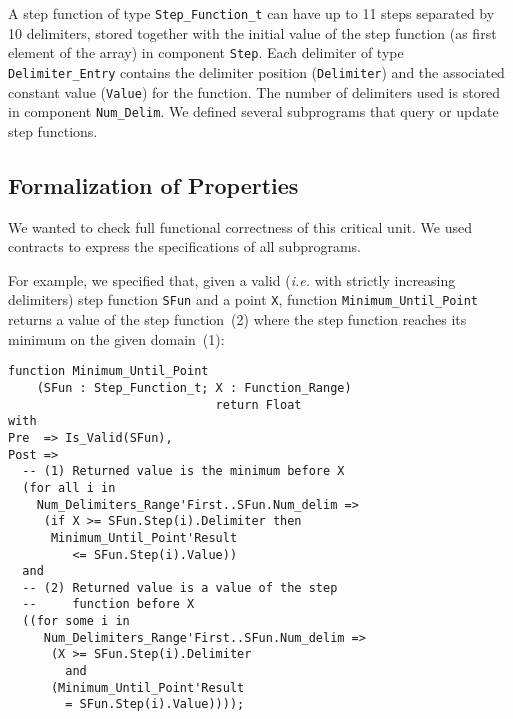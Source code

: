 \documentclass[10pt,a4paper,twocolumn]{article}
\newcommand{\ie}{\textit{i.e.}\xspace}
\begin{document}
A step function of type \verb|Step_Function_t| can have up to 11 steps
separated by 10 delimiters, stored together with the initial value of
the step function (as first element of the array) in component
\verb|Step|. Each delimiter of type \verb|Delimiter_Entry| contains
the delimiter position (\verb|Delimiter|) and the associated constant
value (\verb|Value|) for the function. The number of delimiters used
is stored in component \verb|Num_Delim|. We defined several
subprograms that query or update step functions.

\subsection{Formalization of Properties}

We wanted to check full functional correctness of this critical
unit. We used contracts to express the specifications of all
subprograms.

For example, we specified that, given a valid (\ie with strictly
increasing delimiters) step function \verb|SFun| and a point \verb|X|,
function \verb|Minimum_Until_Point| returns a value of the step
function~(2) where the step function reaches its minimum on the given
domain~(1):

\begin{lstlisting}
function Minimum_Until_Point
    (SFun : Step_Function_t; X : Function_Range)
                             return Float
with
Pre  => Is_Valid(SFun),
Post =>
  -- (1) Returned value is the minimum before X
  (for all i in
    Num_Delimiters_Range'First..SFun.Num_delim =>
     (if X >= SFun.Step(i).Delimiter then
      Minimum_Until_Point'Result
         <= SFun.Step(i).Value))
  and
  -- (2) Returned value is a value of the step
  --     function before X
  ((for some i in
     Num_Delimiters_Range'First..SFun.Num_delim =>
      (X >= SFun.Step(i).Delimiter
        and
      (Minimum_Until_Point'Result
        = SFun.Step(i).Value))));
\end{lstlisting}
\end{document}
